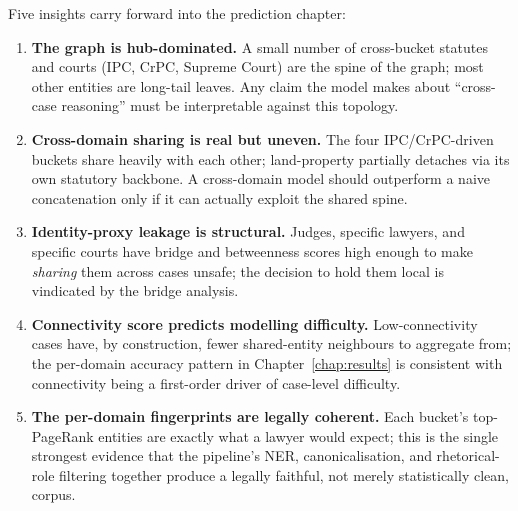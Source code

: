 Five insights carry forward into the prediction chapter:

\begin{enumerate}
  \item \textbf{The graph is hub-dominated.} A small number of
    cross-bucket statutes and courts (IPC, CrPC, Supreme Court) are
    the spine of the graph; most other entities are long-tail leaves.
    Any claim the model makes about ``cross-case reasoning'' must be
    interpretable against this topology.
  \item \textbf{Cross-domain sharing is real but uneven.} The four
    IPC/CrPC-driven buckets share heavily with each other; land-property
    partially detaches via its own statutory backbone. A cross-domain
    model should outperform a naive concatenation only if it can
    actually exploit the shared spine.
  \item \textbf{Identity-proxy leakage is structural.} Judges,
    specific lawyers, and specific courts have bridge and betweenness
    scores high enough to make \emph{sharing} them across cases
    unsafe; the decision to hold them local is vindicated by the
    bridge analysis.
  \item \textbf{Connectivity score predicts modelling difficulty.}
    Low-connectivity cases have, by construction, fewer shared-entity
    neighbours to aggregate from; the per-domain accuracy pattern in
    Chapter~\ref{chap:results} is consistent with connectivity being a
    first-order driver of case-level difficulty.
  \item \textbf{The per-domain fingerprints are legally coherent.}
    Each bucket's top-PageRank entities are exactly what a lawyer
    would expect; this is the single strongest evidence that the
    pipeline's NER, canonicalisation, and rhetorical-role filtering
    together produce a legally faithful, not merely statistically
    clean, corpus.
\end{enumerate}
